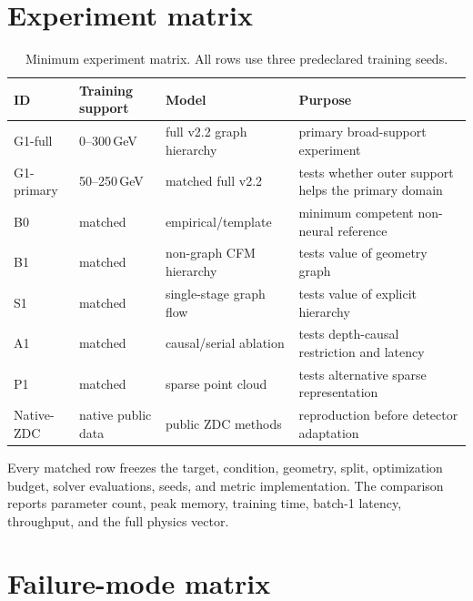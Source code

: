 \documentclass[10pt,a4paper]{article}
\begin{document}
\section{Experiment matrix}

\begin{table}[ht]
\centering
\caption{Minimum experiment matrix. All rows use three predeclared training seeds.}
\begin{tabularx}{\textwidth}{@{}p{}p{}p{}Y@{}}
\toprule
ID & Training support & Model & Purpose \\
\midrule
G1-full & 0--300\,GeV & full v2.2 graph hierarchy & primary broad-support experiment \\
G1-primary & 50--250\,GeV & matched full v2.2 & tests whether outer support helps the primary domain \\
B0 & matched & empirical/template & minimum competent non-neural reference \\
B1 & matched & non-graph CFM hierarchy & tests value of geometry graph \\
S1 & matched & single-stage graph flow & tests value of explicit hierarchy \\
A1 & matched & causal/serial ablation & tests depth-causal restriction and latency \\
P1 & matched & sparse point cloud & tests alternative sparse representation \\
Native-ZDC & native public data & public ZDC methods & reproduction before detector adaptation \\
\bottomrule
\end{tabularx}
\end{table}

Every matched row freezes the target, condition, geometry, split, optimization budget, solver evaluations, seeds, and metric implementation. The comparison reports parameter count, peak memory, training time, batch-1 latency, throughput, and the full physics vector.

\section{Failure-mode matrix}
\end{document}
